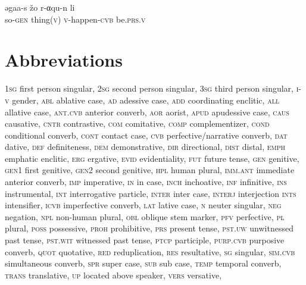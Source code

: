 \documentclass[output=paper]{LSP/langsci}
\begin{document}
\begin{exe}
\gll  əgaa-s žo r-αqu-n li\\
so-\textsc{gen} thing(\textsc{v}) \textsc{v}-happen-\textsc{cvb} be.\textsc{prs.v}  \\
\glt {}
\end{exe}

\section*{Abbreviations}


\textsc{1sg}		first person singular,
\textsc{2sg}		second person singular,
\textsc{3sg} 		third person singular,
\textsc{i-v}		gender,
\textsc{abl}		ablative case,
\textsc{ad}		adessive case,
\textsc{add}		coordinating enclitic,
\textsc{all}		allative case,
\textsc{ant.cvb}	anterior converb,
\textsc{aor}		aorist,
\textsc{apud}		apudessive case,
\textsc{caus}		causative,
\textsc{cntr}		contrastive,
\textsc{com}		comitative,
\textsc{comp}		complementizer,	
\textsc{cond}		conditional converb,
\textsc{cont}		contact case,
\textsc{cvb}		perfective/narrative converb,
\textsc{dat}		dative,
\textsc{def}		definiteness,
\textsc{dem}		demonstrative,
\textsc{dir}		directional,
\textsc{dist}		distal,
\textsc{emph}		emphatic enclitic,
\textsc{erg}		ergative,
\textsc{evid}		evidentiality,
\textsc{fut}		future tense,
\textsc{gen}		genitive,
\textsc{gen1}		first genitive,
\textsc{gen2} 		second genitive,
\textsc{hpl}		human plural,
\textsc{imm.ant}	immediate anterior converb,
\textsc{imp}		imperative,
\textsc{in}		in case,
\textsc{inch}		inchoative,
\textsc{inf}		infinitive,
\textsc{ins}		instrumental,
\textsc{int}		interrogative particle,
\textsc{inter} 		inter case,
\textsc{interj}	interjection
\textsc{ints}		intensifier,
\textsc{icvb}		imperfective converb,
\textsc{lat}		lative case,
\textsc{n}		neuter singular,
\textsc{neg}		negation,
\textsc{npl}		non-human plural,
\textsc{obl}		oblique stem marker,
\textsc{pfv}		perfective,
\textsc{pl}		plural,
\textsc{poss}		possessive,
\textsc{proh}		prohibitive,
\textsc{prs}		present tense,
\textsc{pst.uw}		unwitnessed past tense,
\textsc{pst.wit}		witnessed past tense,
\textsc{ptcp}		participle,
\textsc{purp.cvb}	purposive  converb,
\textsc{quot}		quotative,
\textsc{red}		reduplication,
\textsc{res}		resultative,
\textsc{sg}		singular,
\textsc{sim.cvb}	simultaneous converb,
\textsc{spr}		super case, 
\textsc{sub}		sub case,
\textsc{temp}		temporal  converb,
\textsc{trans}	translative,
\textsc{up}		located above speaker,
\textsc{vers}		versative,



\sloppy

\printbibliography[heading=subbibliography,notkeyword=this]
\end{document}
